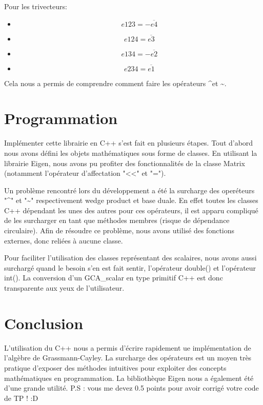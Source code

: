 \documentclass[12pt]{article}
\begin{document}
Pour les trivecteurs: 
\begin{itemize}
\item $$e123=-\overline{e4} $$ \item $$e124=\overline{e3} $$ \item $$e134=-\overline{e2} $$ \item $$e234=\overline{e1}$$
\end{itemize}

Cela nous a permis de comprendre comment faire les opérateurs \textasciicircum  et \textasciitilde.


\section{Programmation}
Implémenter cette librairie en C++ s'est fait en plusieurs étapes. Tout d'abord nous avons défini les objets mathématiques sous forme de classes.
En utilisant la librairie Eigen, nous avons pu profiter des fonctionnalités de la classe Matrix (notamment l'opérateur d'affectation "<<" et "=").

Un problème rencontré lors du développement a été la surcharge des operéteurs "\textasciicircum" et "\textasciitilde" respectivement wedge product et base duale.
En effet toutes les classes C++ dépendant les unes des autres pour ces opérateurs, il est apparu compliqué de les surcharger en tant que méthodes membres (risque de dépendance circulaire).
Afin de résoudre ce problème, nous avons utilisé des fonctions externes, donc reliées à aucune classe.

Pour faciliter l'utilisation des classes représentant des scalaires, nous avons aussi surchargé quand le besoin s'en est fait sentir, l'opérateur double() et l'opérateur int(). La conversion d'un GCA\_scalar en type primitif C++ est donc transparente aux yeux de l'utilisateur. 



\newpage
\section{Conclusion}
L'utilisation du C++ nous a permis d'écrire rapidement ue implémentation de l'algèbre de Grassmann-Cayley. La surcharge des opérateurs est un moyen très pratique d'exposer des méthodes intuitives pour exploiter des concepts mathématiques en programmation.
La bibliothèque Eigen nous a également été d'une grande utilité.
\newline P.S : vous me devez 0.5 points pour avoir corrigé votre code de TP ! :D

\end{document}
